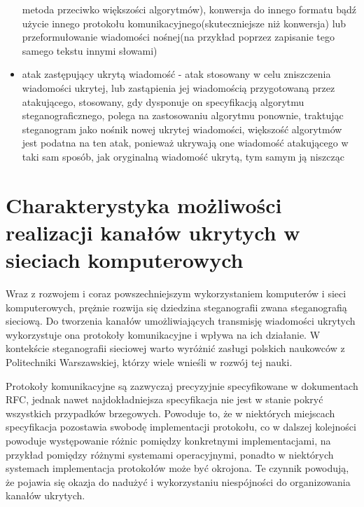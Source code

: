 \documentclass[a4paper, twoside]{report}
\begin{document}
\begin{itemize}
                metoda przeciwko większości algorytmów), konwersja do innego formatu
                bądź użycie innego protokołu komunikacyjnego(skuteczniejsze niż konwersja) lub
                przeformułowanie wiadomości nośnej(na przykład poprzez zapisanie tego samego tekstu
                innymi słowami)
            \item atak zastępujący ukrytą wiadomość - atak stosowany w celu zniszczenia
                wiadomości ukrytej, lub zastąpienia jej wiadomością przygotowaną przez atakującego,
                stosowany, gdy dysponuje on specyfikacją algorytmu steganograficznego,
                polega na zastosowaniu algorytmu ponownie, traktując steganogram jako nośnik
                nowej ukrytej wiadomości, większość algorytmów jest podatna na ten
                atak, ponieważ ukrywają one wiadomość atakującego w taki sam sposób,
                jak oryginalną wiadomość ukrytą, tym samym ją niszcząc
        \end{itemize}


\chapter{Charakterystyka możliwości realizacji kanałów ukrytych w sieciach komputerowych}
    Wraz z rozwojem i coraz powszechniejszym wykorzystaniem komputerów i sieci
    komputerowych, prężnie rozwija się dziedzina steganografii zwana steganografią
    sieciową. Do tworzenia kanałów umożliwiających transmisję wiadomości ukrytych
    wykorzystuje ona protokoły komunikacyjne i wpływa na ich działanie. W kontekście
    steganografii sieciowej warto wyróżnić zasługi polskich naukowców z Politechniki
    Warszawskiej, którzy wiele wnieśli w rozwój tej nauki\cite{STEGANOGRAFIASIECIOWAART}.

    Protokoły komunikacyjne są zazwyczaj
    precyzyjnie specyfikowane w dokumentach RFC, jednak nawet najdokładniejsza
    specyfikacja nie jest w stanie pokryć wszystkich przypadków brzegowych. Powoduje
    to, że w niektórych miejscach specyfikacja pozostawia swobodę implementacji protokołu,
    co w dalszej kolejności powoduje występowanie różnic pomiędzy konkretnymi
    implementacjami, na przykład pomiędzy różnymi systemami operacyjnymi, ponadto
    w niektórych systemach implementacja protokołów może być okrojona. Te czynnik
    powodują, że pojawia się okazja do nadużyć i wykorzystaniu niespójności do organizowania
    kanałów ukrytych.
\end{document}
